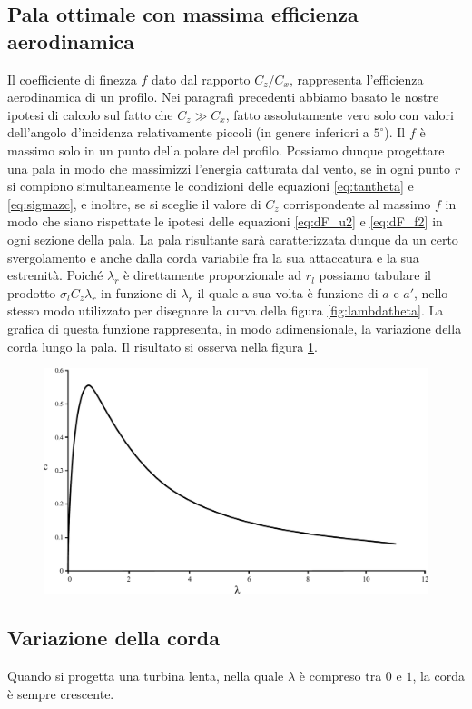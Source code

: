 \subsection{Pala ottimale con massima efficienza aerodinamica}
Il coefficiente di finezza $f$ dato dal rapporto $C_z/C_x$, rappresenta l'efficienza aerodinamica di un profilo. Nei paragrafi precedenti abbiamo basato le nostre ipotesi di calcolo sul fatto che $C_z \gg C_x $, fatto assolutamente vero solo con valori dell'angolo d'incidenza relativamente piccoli (in genere inferiori a $5^\circ$). Il $f$ è massimo solo in un punto della polare del profilo. Possiamo dunque progettare una pala in modo che massimizzi l'energia catturata dal vento, se in ogni punto $r$ si compiono simultaneamente le condizioni delle equazioni \ref{eq:tantheta} e \ref{eq:sigmazc}, e inoltre, se si sceglie il valore di $C_z$ corrispondente al massimo $f$ in modo che siano rispettate le ipotesi delle equazioni \ref{eq:dF_u2} e \ref{eq:dF_f2} in ogni sezione della pala. La pala risultante sarà caratterizzata dunque da un certo svergolamento e anche dalla corda variabile fra la sua attaccatura e la sua estremità. Poiché $\lambda_r$ è direttamente proporzionale ad $r_l$ possiamo tabulare il prodotto $\sigma_l C_z \lambda_r$ in funzione di $\lambda_r$ il quale a sua volta è funzione di $a$ e $a'$, nello stesso modo utilizzato per disegnare la curva della figura \ref{fig:lambdatheta}. La grafica di questa funzione rappresenta, in modo adimensionale, la variazione della corda lungo la pala. Il risultato si osserva nella figura \ref{fig:lambdacz}.
\begin{figure}[h!]
\centering
  \includegraphics[width=.7\textwidth]{fig/lambdacz.pdf}
\caption{}
\label{fig:lambdacz}
\end{figure}
\subsection{Variazione della corda}
Quando si progetta una turbina lenta, nella quale $\lambda$ è compreso tra $0$ e $1$, la corda è sempre crescente. 


